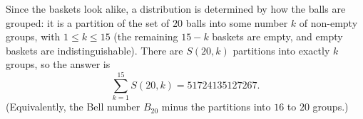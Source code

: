 Since the baskets look alike, a distribution is determined by how the balls are grouped: it is a partition of the set of $20$ balls into some number $k$ of non-empty groups, with $1\le k\le15$ (the remaining $15-k$ baskets are empty, and empty baskets are indistinguishable). There are $S(20,k)$ partitions into exactly $k$ groups, so the answer is
\[
\boxed{\sum_{k=1}^{15}S(20,k)}=51724135127267 .
\]
(Equivalently, the Bell number $B_{20}$ minus the partitions into $16$ to $20$ groups.)
